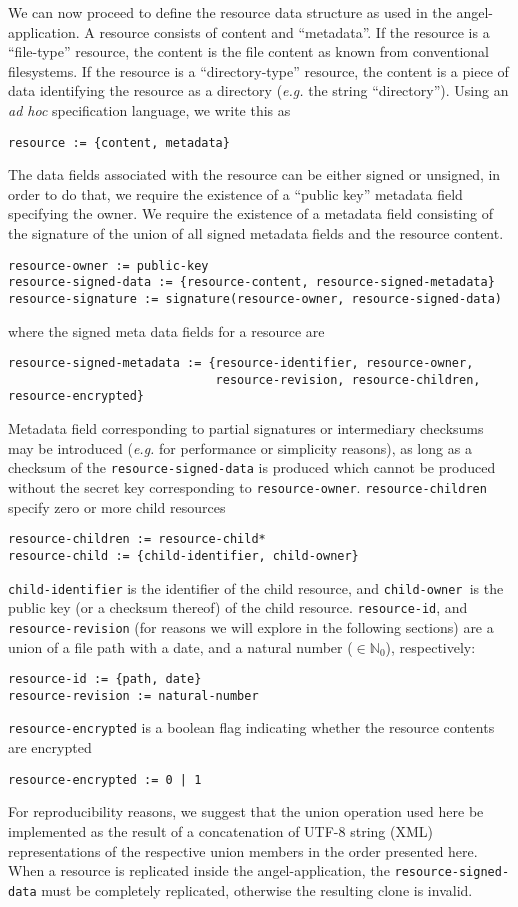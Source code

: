 \documentclass[11pt]{article}
\begin{document}
\begin{mainmatter}
We can now proceed to define the resource data structure as used in the angel-application. A resource consists of content and ``metadata''. If the resource is a ``file-type'' resource, the content is the file content as known from conventional filesystems. If the resource is a ``directory-type'' resource, the content is a piece of data identifying the resource as a directory (\emph{e.g.} the string ``directory''). Using an \emph{ad hoc} specification language, we write this as
\begin{verbatim}
resource := {content, metadata}
\end{verbatim}
The data fields associated with the resource can be either signed or unsigned, in order to do that, we require the existence of a ``public key'' metadata field specifying the owner. We require the existence of a metadata field consisting of the signature of the union of all signed metadata fields and the resource content. 
\begin{verbatim}
resource-owner := public-key
resource-signed-data := {resource-content, resource-signed-metadata}
resource-signature := signature(resource-owner, resource-signed-data)
\end{verbatim}
where the signed meta data fields for a resource are
\begin{verbatim}
resource-signed-metadata := {resource-identifier, resource-owner, 
                             resource-revision, resource-children, resource-encrypted}
\end{verbatim}
Metadata field corresponding to partial signatures or intermediary checksums may be introduced (\emph{e.g.} for performance or simplicity reasons), as long as a checksum of the \texttt{resource-signed-data} is produced which cannot be produced without the secret key corresponding to \texttt{resource-owner}.
\texttt{resource-children} specify zero or more child resources
\begin{verbatim}
resource-children := resource-child*
resource-child := {child-identifier, child-owner}
\end{verbatim}
\texttt{child-identifier} is the identifier of the child resource, and \texttt{child-owner }is the public key (or a checksum thereof) of the child resource. \texttt{resource-id}, and \texttt{resource-revision} (for reasons we will explore in the following sections) are a union of a file path with a date, and a natural number ($\in \mathbb N_0$), respectively:
\begin{verbatim}
resource-id := {path, date}
resource-revision := natural-number
\end{verbatim} 
\texttt{resource-encrypted} is a boolean flag indicating whether the resource contents are encrypted
\begin{verbatim}
resource-encrypted := 0 | 1
\end{verbatim}
For reproducibility reasons, we suggest that the union operation used here be implemented as the result of a concatenation of UTF-8 string (XML) representations of the respective union members in the order presented here. When a resource is replicated inside the angel-application, the \texttt{resource-signed-data} must be completely replicated, otherwise the resulting clone is invalid.


\end{mainmatter}
\end{document}
